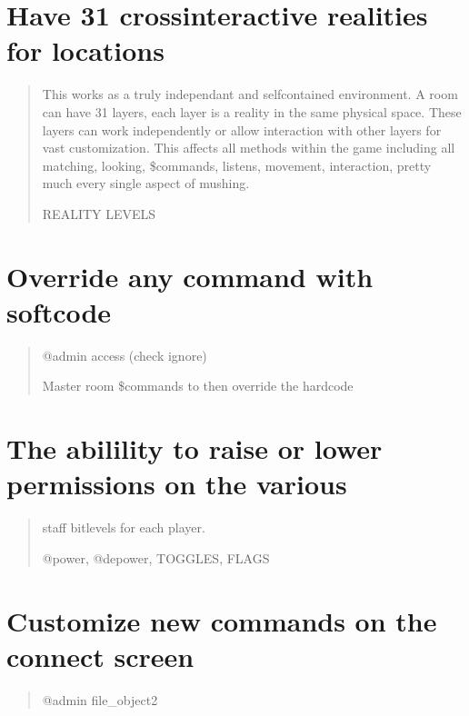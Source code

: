 \documentclass[letterpaper,10pt,english]{sphinxmanual}
\begin{document}
\section{Have 31 cross\sphinxhyphen{}interactive realities for locations}
\label{\detokenize{features:have-31-cross-interactive-realities-for-locations}}\begin{quote}

\sphinxAtStartPar
This works as a truly independant and self\sphinxhyphen{}contained environment.
A room can have 31 \textquotesingle{}layers\textquotesingle{}, each \textquotesingle{}layer\textquotesingle{} is a reality in
the same physical space.  These layers can work independently
or allow interaction with other layers for vast customization.
This affects all methods within the game including all matching,
looking, \$commands, listens, movement, interaction, pretty
much every single aspect of mushing.

\sphinxAtStartPar
REALITY LEVELS
\end{quote}


\section{Override any command with softcode}
\label{\detokenize{features:override-any-command-with-softcode}}\begin{quote}

\sphinxAtStartPar
@admin access (check ignore)

\sphinxAtStartPar
Master room \$commands to then override the hardcode
\end{quote}


\section{The abilility to raise or lower permissions on the various}
\label{\detokenize{features:the-abilility-to-raise-or-lower-permissions-on-the-various}}\begin{quote}

\sphinxAtStartPar
staff bitlevels for each player.

\sphinxAtStartPar
@power, @depower, TOGGLES, FLAGS
\end{quote}


\section{Customize new commands on the connect screen}
\label{\detokenize{features:customize-new-commands-on-the-connect-screen}}\begin{quote}

\sphinxAtStartPar
@admin file\_object2
\end{quote}
\end{document}
